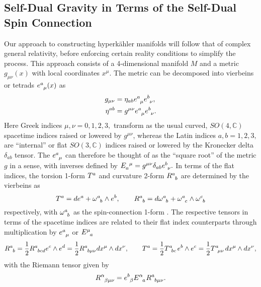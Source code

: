 \documentclass[a4paper,12pt, onecolumn, notitlepage]{article}
\theoremstyle{definition}
\theoremstyle{remark}
\newcommand{\al}{\alpha}
\newcommand{\w}{\omega}
\newcommand{\m}{\mu}
\newcommand{\n}{\nu}
\newcommand{\HK}{hyperk\"ahler }
\begin{document}
\subsection{Self-Dual Gravity in Terms of the Self-Dual Spin Connection}
Our approach to constructing \HK manifolds will follow that of complex general relativity, before enforcing certain reality conditions to simplify the process. This approach consists of a 4-dimensional manifold $M$ and a metric $g_{\m\n}(x)$ with local coordinates $x^{\m}.$ The metric can be decomposed into vierbeins or tetrads $e\indices{^a_\m}(x)$ as
\begin{align*}
	g_{\m\n} &= \eta_{ab}e\indices{^a_\m}e\indices{^b_\n},\\
	\eta^{ab} &= g^{\m\n}e\indices{^a_\m}e\indices{^b_\n}.
\end{align*}
Here Greek indices $\m,\n=0,1,2,3,$ transform as the usual curved, $SO(4,\mathbb{C})$ spacetime indices raised or lowered by $g^{\m\n}$, whereas the Latin indices $a,b=1,2,3,$ are ``internal'' or flat $SO(3,\mathbb{C})$ indices raised or lowered by the Kronecker delta $\delta_{ab}$ tensor. The $e\indices{^a_\m}$ can therefore be thought of as the ``square root'' of the metric $g$ in a sense, with inverses defined by $E\indices{_a^{\m}} = g^{\m\n}\delta_{ab}e\indices{^b_\n}.$ In terms of the flat indices, the torsion 1-form $T\indices{^a}$ and curvature 2-form $R\indices{^a_b}$ are determined by the vierbeins as
\begin{equation*}
	T\indices{^a} = de\indices{^a} + \w\indices{^a_b}\wedge e\indices{^b},\qquad R\indices{^a_b} = d\w\indices{^a_b} + \w\indices{^a_c}\wedge\w\indices{^c_b}
\end{equation*}
respectively, with $\w\indices{^a_b}$ as the spin-connection 1-form \cite{eguchi_1980}. The respective tensors in terms of the spacetime indices are related to their flat index counterparts through multiplication by $e\indices{^a_\m}$ or $E\indices{^\m_a}$
\begin{equation*}
R\indices{^a_b}=\frac{1}{2}R\indices{^a_b_c_d}e\indices{^c}\wedge e\indices{^d}=\frac{1}{2}R\indices{^a_b_\m_\n}dx\indices{^\m}\wedge dx\indices{^\n},\qquad T\indices{^a} = \frac{1}{2}T\indices{^a_b_c}e\indices{^b}\wedge e\indices{^c}=\frac{1}{2}T\indices{^a_\m_\n}dx\indices{^\m}\wedge dx\indices{^\n},
\end{equation*}
with the Riemann tensor given by
\begin{equation*}
	\label{riemann}
	R\indices{^\al_\beta_\mu_\n} = e\indices{^b_\beta}E\indices{^\al_a}R\indices{^a_b_\m_\n}.
\end{equation*}
\end{document}
